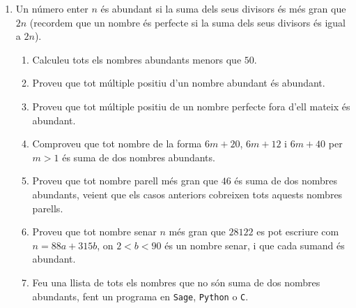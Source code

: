 \begin{enumerate}[leftmargin=*]
\item Un número enter $n$ és abundant si la suma dels seus
divisors és més gran que $2n$ (recordem que un nombre és perfecte si
la suma dels seus divisors és igual a $2n$).
\begin{enumerate}
\item Calculeu tots els nombres abundants menors que $50$.
\item Proveu que tot múltiple positiu d'un nombre abundant és abundant.
\item Proveu que tot múltiple positiu de un nombre perfecte fora d'ell mateix és abundant.
\item Comproveu que tot nombre de la forma $6m+20$, $6m+12$ i $6m+40$ per $m>1$ és suma de dos nombres abundants.
\item Proveu que tot nombre parell més gran que $46$ és suma de dos
nombres abundants, veient que els casos anteriors cobreixen tots
aquests nombres parells.
\item Proveu que tot nombre senar $n$ més gran que $28122$ es pot
escriure com $n=88a+315b$, on $2 < b < 90 $ és un nombre senar, i
que cada sumand és abundant.
\item Feu una llista de tots els nombres que no són suma de dos nombres abundants, fent
un programa en \texttt{Sage}, \texttt{Python} o \texttt{C}.
\end{enumerate}

\end{enumerate}